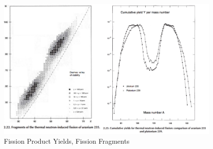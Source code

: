 \documentclass{school-22.211-notes}
\date{April  9, 2012}
\begin{document}
\maketitle

\begin{figure}
  \centering
  \includegraphics[width=5in]{images/dfs/fission-product-yield.png}
  \caption{Fission Product Yields, Fission Fragments}
\end{figure}
\end{document}
